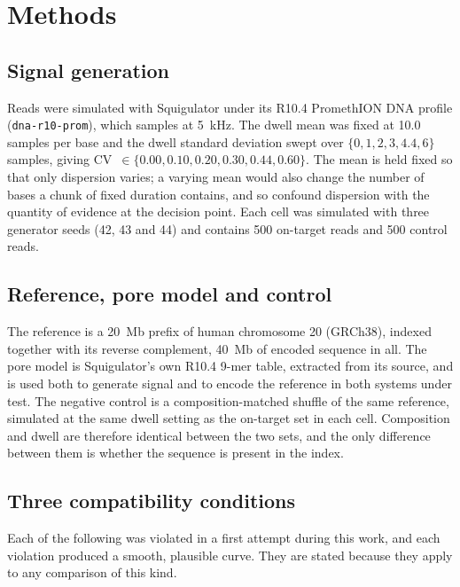 \documentclass[11pt,a4paper]{article}
\begin{document}
\section{Methods}\label{sec:methods}

\subsection{Signal generation}\label{sec:generation}

Reads were simulated with Squigulator under its R10.4 PromethION DNA profile
(\texttt{dna-r10-prom}), which samples at 5~kHz. The dwell mean was fixed at 10.0 samples per base
and the dwell standard deviation swept over $\{0, 1, 2, 3, 4.4, 6\}$ samples, giving
CV~$\in \{0.00, 0.10, 0.20, 0.30, 0.44, 0.60\}$. The mean is held fixed so that only dispersion
varies; a varying mean would also change the number of bases a chunk of fixed duration contains,
and so confound dispersion with the quantity of evidence at the decision point. Each cell was
simulated with three generator seeds (42, 43 and 44) and contains 500 on-target reads and 500
control reads.

\subsection{Reference, pore model and control}\label{sec:reference}

The reference is a 20~Mb prefix of human chromosome 20 (GRCh38), indexed together with its reverse
complement, 40~Mb of encoded sequence in all. The pore model is Squigulator's own R10.4 9-mer
table, extracted from its source, and is used both to generate signal and to encode the reference
in both systems under test. The negative control is a composition-matched shuffle of the same
reference, simulated at the same dwell setting as the on-target set in each cell. Composition and
dwell are therefore identical between the two sets, and the only difference between them is
whether the sequence is present in the index.

\subsection{Three compatibility conditions}\label{sec:compat}

Each of the following was violated in a first attempt during this work, and each violation
produced a smooth, plausible curve. They are stated because they apply to any comparison of this
kind.
\end{document}
